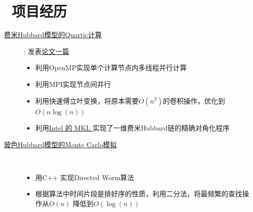 \documentclass{resume}
\begin{document}
\section{\faUsers\ 项目经历}
\begin{description}
  \item[\href{https://github.com/RiceReallyGood/Quartic}{费米Hubbard模型的Quartic计算}]: 
    发表\href{https://journals.aps.org/pre/abstract/10.1103/PhysRevE.101.023310}{论文一篇}
  \begin{itemize}
    \item 利用OpenMP实现单个计算节点内多线程并行计算
    \item 利用MPI实现节点间并行
    \item 利用快速傅立叶变换，将原本需要$O(n^2)$的卷积操作，优化到$O(n \log (n))$
    \item 利用\href{https://software.intel.com/en-us/mkl}{Intel 的 MKL }实现了一维费米Hubbard链的精确对角化程序
  \end{itemize} 
  \item[\href{https://github.com/RiceReallyGood/BHM_QMC}{玻色Hubbard模型的Monte Carlo模拟}]\ 
  \begin{itemize}
    \item 用C++ 实现Directed Worm算法
    \item 根据算法中时间片段是排好序的性质，利用二分法，将最频繁的查找操作从$O(n)$
    降低到$O(\log (n))$
  \end{itemize} 
\end{description}


\end{document}
